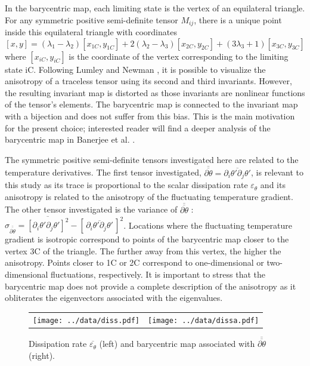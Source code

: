 \documentclass[review]{elsarticle}
\newcommand{\epst}{\varepsilon_\theta}
\begin{document}
In the barycentric map, each limiting state is the vertex of an equilateral triangle. For any symmetric positive semi-definite tensor $M_{ij}$, there is a unique point inside this equilateral triangle with coordinates
\begin{equation}
\left[ x,y \right] = \left( \lambda_1 - \lambda_2 \right) \left[ x_{1C},y_{1C} \right] + 2 \left( \lambda_2 - \lambda_3 \right) \left[ x_{2C},y_{2C} \right] + \left( 3\lambda_3 + 1 \right) \left[ x_{3C},y_{3C} \right]
\end{equation}
where $\left[x_{iC},y_{iC} \right]$ is the coordinate of the vertex corresponding to the limiting state iC. Following Lumley and Newman \cite{lumley1977return}, it is possible to visualize the anisotropy of a traceless tensor using its second and third invariants. However, the resulting invariant map is distorted as those invariants are nonlinear functions of the tensor’s elements. The barycentric map is connected to the invariant map with a bijection and does not suffer from this bias. This is the main motivation for the present choice; interested reader will find a deeper analysis of the barycentric map in Banerjee et al. \citep{banerjee2007presentation}.

The symmetric positive semi-definite tensors investigated here are related to the temperature derivatives. The first tensor investigated, $\overline{\overline{\partial \theta}} = \overline{\partial_i \theta' \partial_j \theta' }$, is relevant to this study as its trace is proportional to the scalar dissipation rate $\epst$ and its anisotropy is related to the anisotropy of the fluctuating temperature gradient. The other tensor investigated is the variance of $\overline{\overline{\partial \theta}}$ : $\sigma_{\overline{\overline{\partial \theta}}} = \overline{\left[\partial_i \theta' \partial_j \theta' \right]^2 } - \left[ \, \overline{\partial_i \theta' \partial_j \theta' } \, \right]^2$. Locations where the fluctuating temperature gradient is isotropic correspond to points of the barycentric map closer to the vertex 3C of the triangle. The further away from this vertex, the higher the anisotropy. Points closer to 1C or 2C correspond to one-dimensional or two-dimensional fluctuations, respectively. It is important to stress that the barycentric map does not provide a complete description of the anisotropy as it obliterates the eigenvectors associated with the eigenvalues.

\begin{figure}[htbp]
\begin{center}
\begin{tabular}{cc}
\texttt{[image: ../data/diss.pdf]} & 
\texttt{[image: ../data/dissa.pdf]}
\end{tabular}
\end{center}
\caption{Dissipation rate $\overline{\epst}$ (left) and barycentric map associated with $\overline{\overline{\partial \theta}}$ (right).}
\label{fig-diss}
\end{figure}
\end{document}
